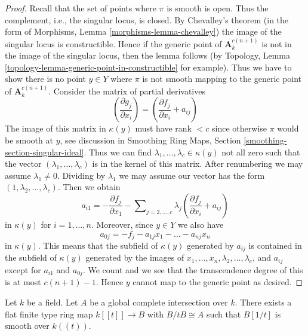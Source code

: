 \begin{proof}
Recall that the set of points where $\pi$ is smooth is open.
Thus the complement, i.e., the singular locus, is closed.
By Chevalley's theorem (in the form of
Morphisms, Lemma \ref{morphisms-lemma-chevalley})
the image of the singular locus is constructible.
Hence if the generic point of $\mathbf{A}^{c(n + 1)}_k$
is not in the image of the singular locus, then
the lemma follows (by Topology, Lemma
\ref{topology-lemma-generic-point-in-constructible} for example).
Thus we have to show there is no point
$y \in Y$ where $\pi$ is not smooth mapping to
the generic point of $\mathbf{A}^{c(n + 1)}_k$.
Consider the matrix of partial derivatives
$$
(\frac{\partial g_j}{\partial x_i}) =
(\frac{\partial f_j}{\partial x_i} + a_{ij})
$$
The image of this matrix in $\kappa(y)$ must have rank $< c$
since otherwise $\pi$ would be smooth at $y$, see discussion in
Smoothing Ring Maps, Section \ref{smoothing-section-singular-ideal}.
Thus we can find $\lambda_1, \ldots, \lambda_c \in \kappa(y)$
not all zero such that the vector $(\lambda_1, \ldots, \lambda_c)$
is in the kernel of this matrix.
After renumbering we may assume $\lambda_1 \not = 0$.
Dividing by $\lambda_1$ we may assume our vector has
the form $(1, \lambda_2, \ldots, \lambda_c)$.
Then we obtain
$$
a_{i1} = -
\frac{\partial f_j}{\partial x_1} -
\sum\nolimits_{j = 2, \ldots, c} \lambda_j(\frac{\partial f_j}{\partial x_i} + a_{ij})
$$
in $\kappa(y)$ for $i = 1, \ldots, n$. Moreover, since $y \in Y$ we also
have
$$
a_{0j} = -f_j - a_{1j}x_1 - \ldots - a_{nj}x_n
$$
in $\kappa(y)$. This means that the subfield of $\kappa(y)$
generated by $a_{ij}$ is contained in the subfield of $\kappa(y)$
generated by the images of $x_1, \ldots, x_n, \lambda_2, \ldots, \lambda_c$,
and $a_{ij}$ except for $a_{i1}$ and $a_{0j}$.
We count and we see that the transcendence degree of this is
at most $c(n + 1) - 1$. Hence $y$ cannot map to the generic point
as desired.
\end{proof}

\begin{lemma}
\label{lemma-smoothing-affine-lci}
Let $k$ be a field. Let $A$ be a global complete intersection
over $k$. There exists a flat finite type ring map
$k[[t]] \to B$ with $B/tB \cong A$ such that
$B[1/t]$ is smooth over $k((t))$.
\end{lemma}

